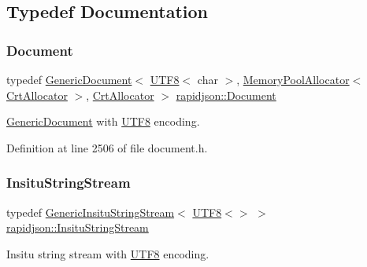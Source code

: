 \subsection{Typedef Documentation}
\mbox{\label{namespacerapidjson_ace11b5b575baf1cccd5ba5f8586dcdc8}} 
\subsubsection{\texorpdfstring{Document}{Document}}
{\footnotesize\ttfamily typedef \mbox{\hyperlink{classrapidjson_1_1_generic_document}{Generic\+Document}}$<$ \mbox{\hyperlink{structrapidjson_1_1_u_t_f8}{U\+T\+F8}}$<$ char $>$, \mbox{\hyperlink{classrapidjson_1_1_memory_pool_allocator}{Memory\+Pool\+Allocator}}$<$ \mbox{\hyperlink{classrapidjson_1_1_crt_allocator}{Crt\+Allocator}} $>$, \mbox{\hyperlink{classrapidjson_1_1_crt_allocator}{Crt\+Allocator}} $>$ \mbox{\hyperlink{namespacerapidjson_ace11b5b575baf1cccd5ba5f8586dcdc8}{rapidjson\+::\+Document}}}



\mbox{\hyperlink{classrapidjson_1_1_generic_document}{Generic\+Document}} with \mbox{\hyperlink{structrapidjson_1_1_u_t_f8}{U\+T\+F8}} encoding. 



Definition at line 2506 of file document.\+h.

\mbox{\label{namespacerapidjson_a64e957c8d9d7cd15b193ffc31410038e}} 
\subsubsection{\texorpdfstring{InsituStringStream}{InsituStringStream}}
{\footnotesize\ttfamily typedef \mbox{\hyperlink{structrapidjson_1_1_generic_insitu_string_stream}{Generic\+Insitu\+String\+Stream}}$<$ \mbox{\hyperlink{structrapidjson_1_1_u_t_f8}{U\+T\+F8}}$<$$>$ $>$ \mbox{\hyperlink{namespacerapidjson_a64e957c8d9d7cd15b193ffc31410038e}{rapidjson\+::\+Insitu\+String\+Stream}}}



Insitu string stream with \mbox{\hyperlink{structrapidjson_1_1_u_t_f8}{U\+T\+F8}} encoding. 



